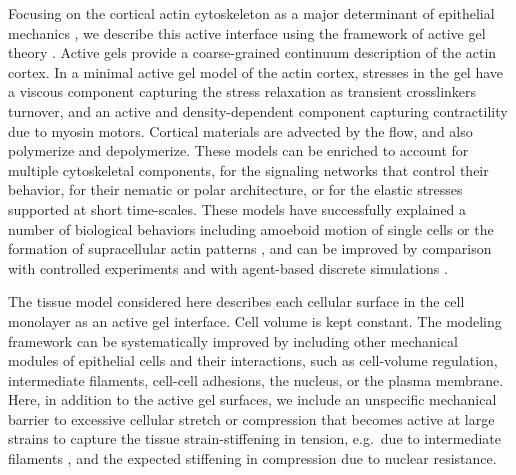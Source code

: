 Focusing on the cortical actin cytoskeleton as a major determinant of epithelial mechanics \cite{latorre2018,khalilgharibi2019,duque2023}, we describe this active interface using the framework of active gel theory \cite{Prost:2015aa}. Active gels provide a coarse-grained continuum description of the actin cortex. In a minimal active gel model of the actin cortex, stresses in the gel have a viscous component capturing the stress relaxation as transient crosslinkers turnover, and an active and density-dependent component capturing contractility due to myosin motors. Cortical materials are advected by the flow, and also polymerize and depolymerize. These models can be enriched to account for multiple cytoskeletal components, for the signaling networks that control their behavior, for their nematic or polar architecture, or for the elastic stresses supported at short time-scales. These models have successfully explained a number of biological behaviors including amoeboid motion of single cells \cite{callan2013} or the formation of supracellular actin patterns \cite{hannezo2015}, and can be improved by comparison with controlled experiments and with agent-based discrete simulations \cite{cortes2020}. 

The tissue model considered here describes each cellular surface in the cell monolayer as an active gel interface. Cell volume is kept constant. The modeling framework can be systematically improved by including other mechanical modules of epithelial cells and their interactions, such as cell-volume regulation, intermediate filaments, cell-cell adhesions, the nucleus, or the plasma membrane. Here, in addition to the active gel surfaces, we include an unspecific mechanical barrier to excessive cellular stretch or compression that becomes active at large strains to capture the tissue strain-stiffening in tension, e.g.~due to intermediate filaments \cite{latorre2018,duque2023}, and the expected stiffening in compression due to nuclear resistance.

